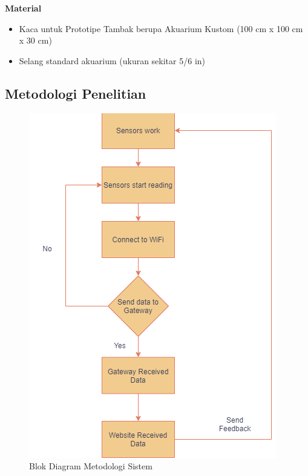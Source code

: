 \textbf{Material}
\begin{itemize}
	\item Kaca untuk Prototipe Tambak berupa Akuarium Kustom (100 cm x 100 cm x 30 cm)
	\item Selang standard akuarium (ukuran sekitar 5/6 in)
\end{itemize}

\subsection {Metodologi Penelitian}
\label{sec:metodologipenelitian}


\begin{figure}[htbp]
  \centering

  \includegraphics[scale=0.5]{gambar/diagramsatuu.png}

  \caption{Blok Diagram Metodologi Sistem} %
  \label{fig:diagramsatu}
\end{figure}

